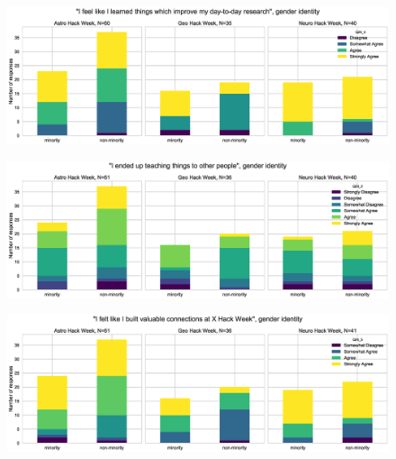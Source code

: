 \documentclass{aastex62}
\begin{document}
\begin{figure}[h!]
\centering
\includegraphics[width=\textwidth]{Q24_4_Q27_stackedbars.eps}
\caption{}
\label{fig:corr5}
\end{figure}

\begin{figure}[h!]
\centering
\includegraphics[width=\textwidth]{Q23_2_Q27_stackedbars.eps}
\caption{}
\label{fig:corr6}
\end{figure}

\begin{figure}[h!]
\centering
\includegraphics[width=\textwidth]{Q24_5_Q27_stackedbars.eps}
\caption{}
\label{fig:corr7}
\end{figure}
\end{document}
